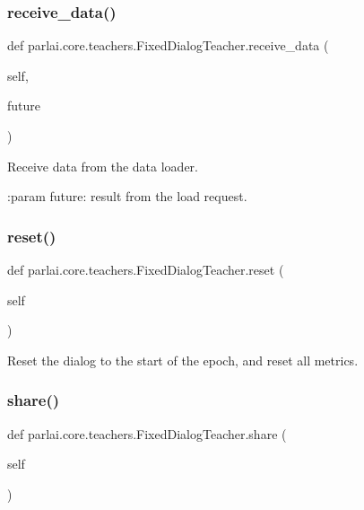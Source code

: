 \subsubsection{\texorpdfstring{receive\+\_\+data()}{receive\_data()}}
{\footnotesize\ttfamily def parlai.\+core.\+teachers.\+Fixed\+Dialog\+Teacher.\+receive\+\_\+data (\begin{DoxyParamCaption}\item[{}]{self,  }\item[{}]{future }\end{DoxyParamCaption})}

\begin{DoxyVerb}Receive data from the data loader.

:param future: result from the load request.
\end{DoxyVerb}
 \mbox{\label{classparlai_1_1core_1_1teachers_1_1FixedDialogTeacher_af0e1160f17d43ace896f71c190e4e5ec}} 
\subsubsection{\texorpdfstring{reset()}{reset()}}
{\footnotesize\ttfamily def parlai.\+core.\+teachers.\+Fixed\+Dialog\+Teacher.\+reset (\begin{DoxyParamCaption}\item[{}]{self }\end{DoxyParamCaption})}

\begin{DoxyVerb}Reset the dialog to the start of the epoch, and reset all metrics.
\end{DoxyVerb}
 \mbox{\label{classparlai_1_1core_1_1teachers_1_1FixedDialogTeacher_af1501d26676b7cf0ed8f41d51c31e686}} 
\subsubsection{\texorpdfstring{share()}{share()}}
{\footnotesize\ttfamily def parlai.\+core.\+teachers.\+Fixed\+Dialog\+Teacher.\+share (\begin{DoxyParamCaption}\item[{}]{self }\end{DoxyParamCaption})}

